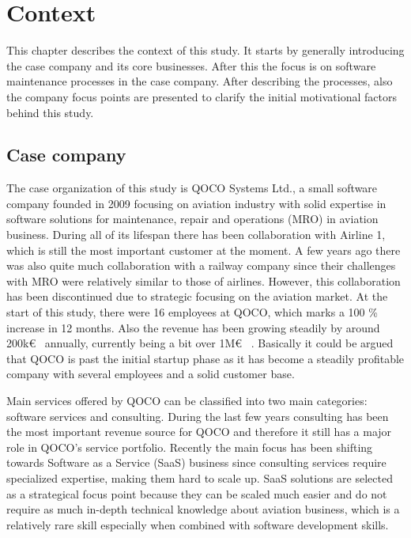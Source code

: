 \chapter{Context}
\label{chapter:context}

This chapter describes the context of this study. It starts by generally introducing the case company and its core businesses. After this
the focus is on software maintenance processes in the case company. After describing the processes, also the company focus points are presented to
clarify the initial motivational factors behind this study.

\section{Case company}
\label{section:case-company}

The case organization of this study is QOCO Systems Ltd., a small software company founded in 2009 focusing on
aviation industry with solid expertise in software solutions for maintenance, repair and operations (MRO) in aviation business.
During all of its lifespan there has been collaboration with Airline 1, which is still the most
important customer at the moment. A few years ago there was also quite much collaboration with a railway company since their
challenges with MRO were relatively similar to those of airlines. However, this collaboration has been discontinued due to
strategic focusing on the aviation market. At the start of this study, there were 16 employees at QOCO, which marks a 100 \% increase in 12 months.
Also the revenue has been growing steadily by around
200k\euro~ annually, currently being a bit over 1M\euro~ \citep{Finder.fi2019}. Basically it could be argued that QOCO is past the initial
startup phase as it has become a steadily profitable company with several employees and a solid customer base.

Main services offered by QOCO can be classified into two main categories: software services and consulting. During the last few years
consulting has been the most important revenue source for QOCO and therefore it still has a major role in QOCO's service portfolio.
Recently the main focus has been shifting towards Software as a Service (SaaS) business since consulting services require specialized expertise, making
them hard to scale up. SaaS solutions are selected as a strategical focus point because they can be scaled much easier and do not require as much in-depth technical
knowledge about aviation business, which is a relatively rare skill especially when combined with software development skills.


